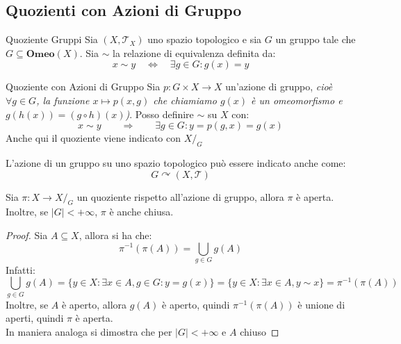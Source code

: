 \documentclass[11pt,a4paper,twoside]{article}
\theoremstyle{definition}
\begin{document}
\subsection{Quozienti con Azioni di Gruppo}

\begin{defn}{Quoziente Gruppi}{}
	Sia $(X, \mathcal T_X)$ uno spazio topologico e sia $G$ un gruppo tale che $G \subseteq \bm{Omeo}(X)$. Sia $\sim$ la relazione di equivalenza definita da:
	\[x \sim y \quad \Leftrightarrow \quad \exists g \in G :g(x)=y\]
\end{defn}

\begin{defn}{Quoziente con Azioni di Gruppo}{}
	Sia $p:G \times X \to X$ un'azione di gruppo, \textit{cioè $\forall g \in G$, la funzione $x \mapsto p(x,g)$ che chiamiamo $g(x)$ è un omeomorfismo e $g(h(x))=(g \circ h)(x)$)}. Posso definire $\sim$ su $X$ con:
	\[ x \sim y \qquad \Rightarrow \qquad \exists g \in G: y = p(g,x) = g(x) \]
	Anche qui il quoziente viene indicato con $X/_G$
\end{defn}

L'azione di un gruppo su uno spazio topologico può essere indicato anche come:
\[ G \curvearrowright (X, \mathcal T) \]

\begin{prop}{}{}
	Sia $\pi:X \to X/_G$ un quoziente rispetto all'azione di gruppo, allora $\pi$ è aperta. Inoltre, se $|G|< + \infty$, $\pi$ è anche chiusa.
\end{prop}

\begin{proof}
	Sia $A\subseteq X$, allora si ha che:
	\[ \pi^{-1}(\pi(A)) = \bigcup_{g \in G}g(A) \]
	Infatti:
	\[ \bigcup_{g \in G}g(A) = \{y \in X: \exists x \in A, g \in G:y = g(x)\} = \{y \in X:\exists x \in A, y \sim x\} = \pi^{-1}(\pi(A))\]
	Inoltre, se $A$ è aperto, allora $g(A)$ è aperto, quindi $\pi^{-1}(\pi(A))$ è unione di aperti, quindi $\pi$ è aperta.\\
	In maniera analoga si dimostra che per $|G|<+ \infty$ e $A$ chiuso
\end{proof}
\end{document}
